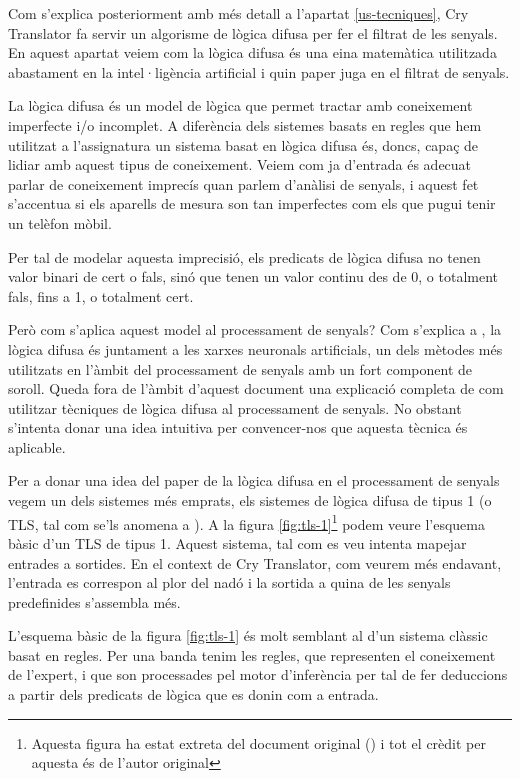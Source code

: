\documentclass[11pt,a4paper]{article}
\begin{document}
Com s'explica posteriorment amb més detall a l'apartat \ref{us-tecniques}, Cry Translator fa servir un algorisme de lògica difusa per fer el filtrat de les senyals. En aquest apartat veiem com la lògica difusa és una eina matemàtica utilitzada abastament en la intel·ligència artificial i quin paper juga en el filtrat de senyals.

La lògica difusa és un model de lògica que permet tractar amb coneixement imperfecte i/o incomplet. A diferència dels sistemes basats en regles que hem utilitzat a l'assignatura un sistema basat en lògica difusa és, doncs, capaç de lidiar amb aquest tipus de coneixement. Veiem com ja d'entrada és adecuat parlar de coneixement imprecís quan parlem d'anàlisi de senyals, i aquest fet s'accentua si els aparells de mesura son tan imperfectes com els que pugui tenir un telèfon mòbil.

Per tal de modelar aquesta imprecisió, els predicats de lògica difusa no tenen valor binari de cert o fals, sinó que tenen un valor continu des de 0, o totalment fals, fins a 1, o totalment cert. 

Però com s'aplica aquest model al processament de senyals? Com s'explica a \cite{fuzzy}, la lògica difusa és juntament a les xarxes neuronals artificials, un dels mètodes més utilitzats en l'àmbit del processament de senyals amb un fort component de soroll. Queda fora de l'àmbit d'aquest document una explicació completa de com utilitzar tècniques de lògica difusa al processament de senyals. No obstant s'intenta donar una idea intuitiva per convencer-nos que aquesta tècnica és aplicable.

Per a donar una idea del paper de la lògica difusa en el processament de senyals vegem un dels sistemes més emprats, els sistemes de lògica difusa de tipus 1 (o TLS, tal com se'ls anomena a \cite{fuzzy}). A la figura \ref{fig:tls-1}\footnote{Aquesta figura ha estat extreta del document original (\cite{fuzzy}) i tot el crèdit per aquesta és de l'autor original} podem veure l'esquema bàsic d'un TLS de tipus 1. Aquest sistema, tal com es veu intenta mapejar entrades a sortides. En el context de Cry Translator, com veurem més endavant, l'entrada es correspon al plor del nadó i la sortida a quina de les senyals predefinides s'assembla més. 

L'esquema bàsic de la figura \ref{fig:tls-1} és molt semblant al d'un sistema clàssic basat en regles. Per una banda tenim les regles, que representen el coneixement de l'expert, i que son processades pel motor d'inferència per tal de fer deduccions a partir dels predicats de lògica que es donin com a entrada. 
\end{document}

